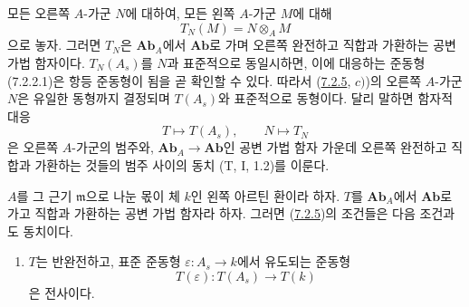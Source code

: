 \begin{remark}[7.2.6]
\label{III.7.2.6-fr}
모든 오른쪽 $A$-가군 $N$에 대하여, 모든 왼쪽 $A$-가군 $M$에 대해
\[
  T_N(M)=N\otimes_A M
\]
으로 놓자. 그러면 $T_N$은 $\mathbf{Ab}_A$에서 $\mathbf{Ab}$로 가며
오른쪽 완전하고 직합과 가환하는 공변 가법 함자이다. $T_N(A_s)$를
$N$과 표준적으로 동일시하면, 이에 대응하는 준동형 (7.2.2.1)은 항등
준동형이 됨을 곧 확인할 수 있다. 따라서 (\hyperref[III.7.2.5-fr]{7.2.5},
$c)$)의 오른쪽 $A$-가군 $N$은 유일한 동형까지 결정되며
$T(A_s)$와 표준적으로 동형이다. 달리 말하면 함자적 대응
\[
  T\longmapsto T(A_s),
  \qquad
  N\longmapsto T_N
\]
은 오른쪽 $A$-가군의 범주와, $\mathbf{Ab}_A\to\mathbf{Ab}$인 공변
가법 함자 가운데 오른쪽 완전하고 직합과 가환하는 것들의 범주 사이의
동치 (T, I, 1.2)를 이룬다.
\end{remark}

\begin{proposition}[7.2.7]
\label{III.7.2.7-fr}
$A$를 그 근기 $\mathfrak m$으로 나눈 몫이 체 $k$인 왼쪽 아르틴
환이라 하자. $T$를 $\mathbf{Ab}_A$에서 $\mathbf{Ab}$로 가고 직합과
가환하는 공변 가법 함자라 하자. 그러면
(\hyperref[III.7.2.5-fr]{7.2.5})의 조건들은 다음 조건과도 동치이다.
\begin{enumerate}
  \item[d)] $T$는 반완전하고, 표준 준동형
    $\varepsilon:A_s\to k$에서 유도되는 준동형
    \[
      T(\varepsilon):T(A_s)\longrightarrow T(k)
    \]
    은 전사이다.
\end{enumerate}
\end{proposition}

